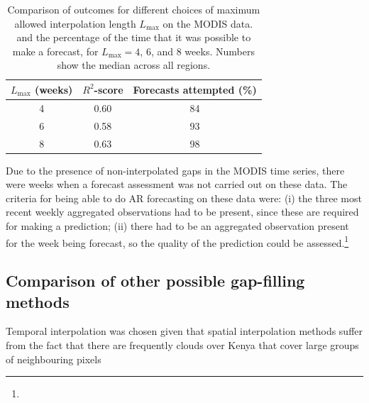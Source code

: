 \documentclass[review]{elsarticle}
\begin{document}
\begin{table}
	\caption{Comparison of outcomes for different choices of maximum allowed interpolation length $L_{\mathrm{max}}$ on the MODIS data.  and the percentage of the time that it was possible to make a forecast, for $L_{\mathrm{max}}=4$, 6, and 8 weeks. Numbers show the median across all regions.} \label{tab:IL choices}
	\centering
	\begin{tabular}{ccc} 
		\toprule
		\textbf{$L_{\mathrm{max}}$ (weeks)}   & \textbf{$R^2$-score}    & \textbf{Forecasts attempted (\%)}\\
		\midrule
		4  & 0.60 & 84 \\
		6  & 0.58 & 93 \\
		8 & 0.63 & 98 \\
		\bottomrule
	\end{tabular}
\end{table}

Due to the presence of non-interpolated gaps in the MODIS time series, there were weeks when a forecast assessment was not carried out on these data. The criteria for being able to do AR forecasting on these data were: (i) the three most recent weekly aggregated observations had to be present, since these are required for making a prediction; (ii) there had to be an aggregated observation present for the week being forecast, so the quality of the prediction could be assessed.\footnote{}


\subsection{Comparison of other possible gap-filling methods} \label{sec:compare}
 Temporal interpolation was chosen given that spatial interpolation methods suffer from the fact that there are frequently clouds over Kenya that cover large groups of neighbouring pixels 
\end{document}

